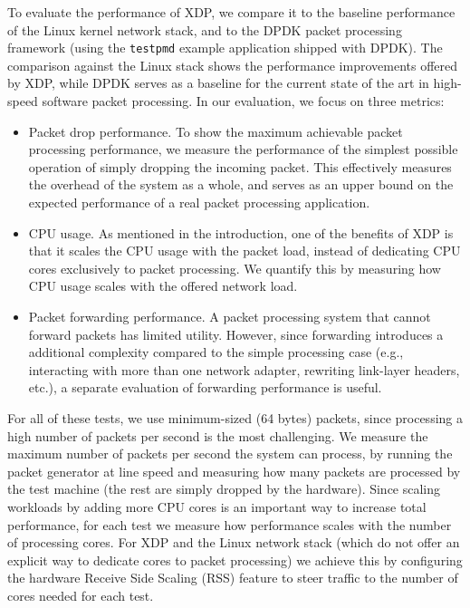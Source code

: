 \documentclass[10pt,sigconf]{acmart}
\begin{document}
To evaluate the performance of XDP, we compare it to the baseline performance of
the Linux kernel network stack, and to the DPDK packet processing framework
(using the \texttt{testpmd} example application shipped with DPDK). The
comparison against the Linux stack shows the performance improvements offered by
XDP, while DPDK serves as a baseline for the current state of the art in
high-speed software packet processing. In our evaluation, we focus on three
metrics:

\begin{itemize}
\item Packet drop performance. To show the maximum achievable packet processing
  performance, we measure the performance of the simplest possible operation of
  simply dropping the incoming packet. This effectively measures the overhead of
  the system as a whole, and serves as an upper bound on the expected
  performance of a real packet processing application.

\item CPU usage. As mentioned in the introduction, one of the benefits of XDP is
  that it scales the CPU usage with the packet load, instead of dedicating CPU
  cores exclusively to packet processing. We quantify this by measuring how CPU
  usage scales with the offered network load.

\item Packet forwarding performance. A packet processing system that cannot
  forward packets has limited utility. However, since forwarding introduces a
  additional complexity compared to the simple processing case (e.g.,
  interacting with more than one network adapter, rewriting link-layer headers,
  etc.), a separate evaluation of forwarding performance is useful.
\end{itemize}

For all of these tests, we use minimum-sized (64 bytes) packets, since
processing a high number of packets per second is the most challenging. We
measure the maximum number of packets per second the system can process, by
running the packet generator at line speed and measuring how many packets are
processed by the test machine (the rest are simply dropped by the hardware).
Since scaling workloads by adding more CPU cores is an important way to increase
total performance, for each test we measure how performance scales with the
number of processing cores. For XDP and the Linux network stack (which do not
offer an explicit way to dedicate cores to packet processing) we achieve this by
configuring the hardware Receive Side Scaling (RSS) feature to steer traffic to
the number of cores needed for each test.
\end{document}
